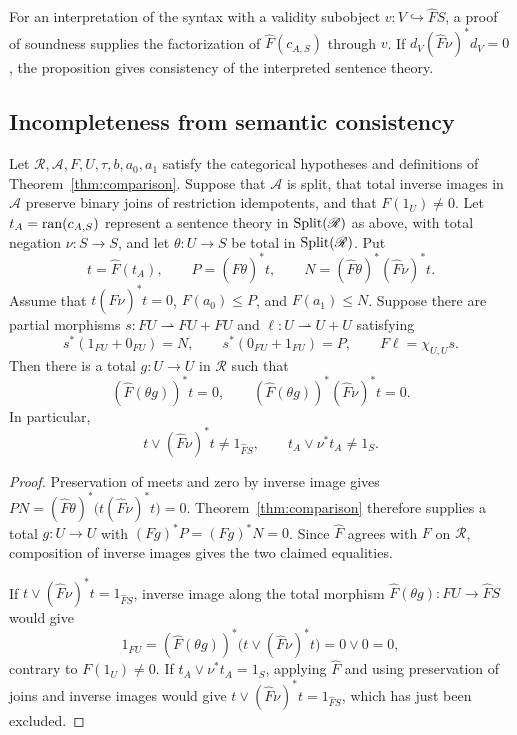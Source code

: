 For an interpretation of the syntax with a validity subobject
$v:V\hookrightarrow\widehat F S$, a proof of soundness supplies
the factorization of $\widehat F(c_{A,S})$ through $v$.
If $d_V(\widehat F\nu)^*d_V=0$, the proposition gives consistency
of the interpreted sentence theory.

\subsection{Incompleteness from semantic consistency}

\begin{theorem}\label{thm:logical-comparison}
Let $\mathscr R,\mathcal A,F,U,\tau,b,a_0,a_1$ satisfy the
categorical hypotheses and definitions of
Theorem~\ref{thm:comparison}. Suppose that $\mathcal A$ is split,
that total inverse images in $\mathcal A$ preserve binary joins
of restriction idempotents, and that $F(1_U)\ne0$.
Let $t_A=\operatorname{ran}(c_{A,S})$ represent a sentence theory in
$\operatorname{Split}(\mathscr R)$ as above, with total negation
$\nu:S\to S$, and let $\theta:U\to S$ be total in
$\operatorname{Split}(\mathscr R)$. Put
\[
 t=\widehat F(t_A),\qquad
 P=(\widehat F\theta)^*t,\qquad
 N=(\widehat F\theta)^*(\widehat F\nu)^*t.
\]
Assume that $t(\widehat F\nu)^*t=0$, $F(a_0)\le P$, and
$F(a_1)\le N$.
Suppose there are partial morphisms
$s:FU\rightharpoonup FU+FU$ and
$\ell:U\rightharpoonup U+U$ satisfying
\[
 s^*(1_{FU}+0_{FU})=N,\qquad
 s^*(0_{FU}+1_{FU})=P,\qquad
 F\ell=\chi_{U,U}s.
\]
Then there is a total $g:U\to U$ in $\mathscr R$ such that
\[
 (\widehat F(\theta g))^*t=0,\qquad
 (\widehat F(\theta g))^*(\widehat F\nu)^*t=0.
\]
In particular,
\[
 t\vee(\widehat F\nu)^*t\ne1_{\widehat F S},\qquad
 t_A\vee\nu^*t_A\ne1_S.
\]
\end{theorem}
\begin{proof}
Preservation of meets and zero by inverse image gives
$PN=(\widehat F\theta)^*\bigl(t(\widehat F\nu)^*t\bigr)=0$.
Theorem~\ref{thm:comparison} therefore supplies a total $g:U\to U$
with $(Fg)^*P=(Fg)^*N=0$. Since $\widehat F$ agrees with $F$ on
$\mathscr R$, composition of inverse images gives the two claimed
equalities.

If $t\vee(\widehat F\nu)^*t=1_{\widehat F S}$, inverse image along
the total morphism $\widehat F(\theta g):FU\to\widehat F S$ would
give
\[
 1_{FU}
 =(\widehat F(\theta g))^*\bigl(t\vee(\widehat F\nu)^*t\bigr)
 =0\vee0=0,
\]
contrary to $F(1_U)\ne0$.
If $t_A\vee\nu^*t_A=1_S$, applying $\widehat F$ and using
preservation of joins and inverse images would give
$t\vee(\widehat F\nu)^*t=1_{\widehat F S}$, which has just
been excluded.
\end{proof}

